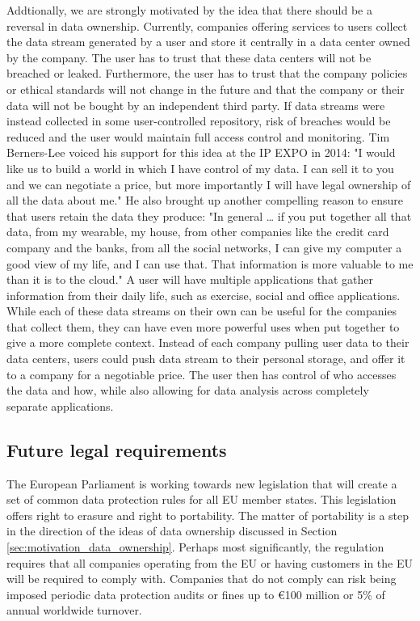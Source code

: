Addtionally, we are strongly motivated by the idea that there should be a reversal in data ownership. Currently, companies offering services to users collect the data stream generated by a user and store it centrally in a data center owned by the company. The user has to trust that these data centers will not be breached or leaked. Furthermore, the user has to trust that the company policies or ethical standards will not change in the future and that the company or their data will not be bought by an independent third party. If data streams were instead collected in some user-controlled repository, risk of breaches would be reduced and the user would maintain full access control and monitoring. Tim Berners-Lee voiced his support for this idea at the IP EXPO in 2014: "I would like us to build a world in which I have control of my data. I can sell it to you and we can negotiate a price, but more importantly I will have legal ownership of all the data about me.\citep{bernerslee2014dataownershiptelegraph}" He also brought up another compelling reason to ensure that users retain the data they produce: "In general … if you put together all that data, from my wearable, my house, from other companies like the credit card company and the banks, from all the social networks, I can give my computer a good view of my life, and I can use that. That information is more valuable to me than it is to the cloud.\citep{bernerslee2014dataownershipguardian}" A user will have multiple applications that gather information from their daily life, such as exercise, social and office applications. While each of these data streams on their own can be useful for the companies that collect them, they can have even more powerful uses when put together to give a more complete context. Instead of each company pulling user data to their data centers, users could push data stream to their personal storage, and offer it to a company for a negotiable price. The user then has control of who accesses the data and how, while also allowing for data analysis across completely separate applications.

\subsection{Future legal requirements}

The European Parliament is working towards new legislation that will create a set of common data protection rules for all EU member states\citep{eudata2013newlegislation}. This legislation offers right to erasure and right to portability. The matter of portability is a step in the direction of the ideas of data ownership discussed in Section \ref{sec:motivation_data_ownership}.  Perhaps most significantly, the regulation requires that all companies operating from the EU or having customers in the EU will be required to comply with. Companies that do not comply can risk being imposed periodic data protection audits or fines up to €100 million or 5\% of annual worldwide turnover.

